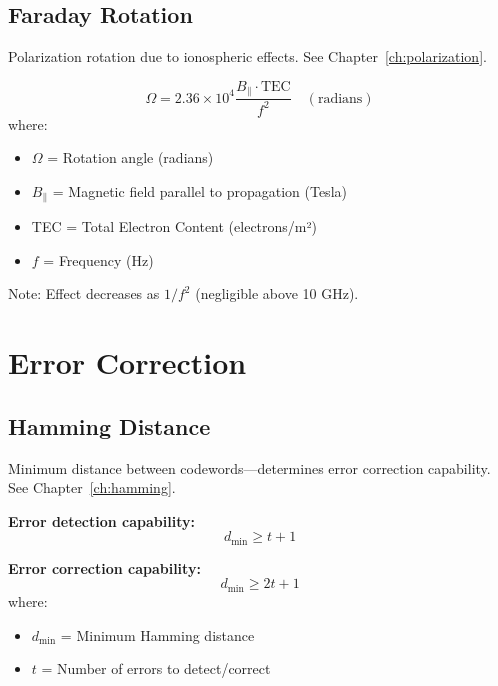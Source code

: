\subsection{Faraday Rotation}
\label{sec:faraday-rotation}

Polarization rotation due to ionospheric effects. See Chapter~\ref{ch:polarization}.

\begin{equation}
\Omega = 2.36 \times 10^4 \frac{B_\parallel \cdot \text{TEC}}{f^2} \quad (\text{radians})
\label{eq:faraday-rotation}
\end{equation}
where:
\begin{itemize}
\item $\Omega$ = Rotation angle (radians)
\item $B_\parallel$ = Magnetic field parallel to propagation (Tesla)
\item TEC = Total Electron Content (electrons/m²)
\item $f$ = Frequency (Hz)
\end{itemize}

Note: Effect decreases as $1/f^2$ (negligible above 10 GHz).

\section{Error Correction}
\label{sec:error-correction}

\subsection{Hamming Distance}
\label{sec:hamming-distance}

Minimum distance between codewords---determines error correction capability. See Chapter~\ref{ch:hamming}.

\textbf{Error detection capability:}
\begin{equation}
d_{\min} \geq t + 1
\label{eq:error-detection}
\end{equation}

\textbf{Error correction capability:}
\begin{equation}
d_{\min} \geq 2t + 1
\label{eq:error-correction}
\end{equation}
where:
\begin{itemize}
\item $d_{\min}$ = Minimum Hamming distance
\item $t$ = Number of errors to detect/correct
\end{itemize}


